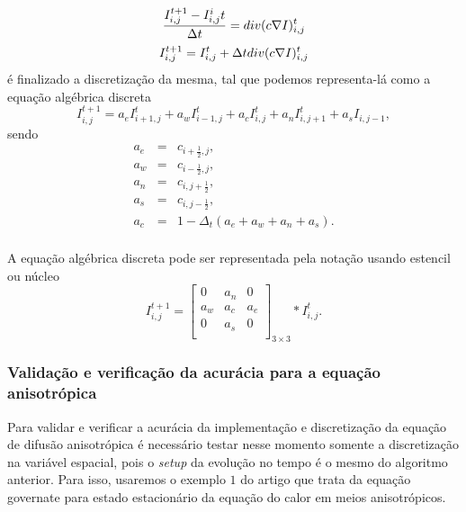 \documentclass[a4paper]{article} %
\begin{document}
\begin{equation}\label{eq10}
	\frac{I_{i,j}^{t+1}-I_{i,j}^i{t}}{\Delta t}=div(c\nabla I)_{i,j}^{t}\\
\end{equation}
\begin{equation}\label{eq11}
	I_{i,j}^{t+1}=I_{i,j}^{t}+\Delta tdiv(c\nabla I)_{i,j}^{t}\\
\end{equation}
é finalizado a discretização da mesma, tal que podemos representa-lá como a equação algébrica discreta
\begin{equation}\label{eq12}
 I_{i,j}^{t+1} = a_eI_{i+1,j}^{t}+a_wI_{i-1,j}^{t}+a_cI_{i,j}^{t}+a_nI_{i,j+1}^{t}+a_sI_{i,j-1},
\end{equation}
sendo   
\begin{equation}\label{eq13}
\begin{array}{lrl}
	a_e & = & c_{i+\frac{1}{2},j},\\
	a_w & = & c_{i-\frac{1}{2},j},\\
	a_n & = & c_{i,j+\frac{1}{2}},\\
	a_s & = & c_{i,j-\frac{1}{2}},\\
	a_c & = & 1 - \Delta_t(a_e+a_w+a_n+a_s).\\
\end{array}
\end{equation}

A equação algébrica discreta pode ser representada pela notação usando estencil ou núcleo
$$I_{i,j}^{t+1}=\left[
\begin{array}{lrl}
 0 &  a_n & 0\\
 a_w &  a_c & a_e\\
 0 &  a_s & 0\\
\end{array}
\right]_{3 \times 3}*I_{i,j}^{t}.$$

\subsubsection{Validação e verificação da acurácia para a equação anisotrópica}

Para validar e verificar a acurácia da implementação e discretização da equação de difusão anisotrópica é necessário testar nesse momento somente a discretização na variável espacial, pois o {\it setup} da evolução no tempo é o mesmo do algoritmo anterior. Para isso, usaremos o exemplo $1$ do artigo \cite{wang2005new} que trata da equação governate para estado estacionário da equação do calor em meios anisotrópicos.
\end{document}

